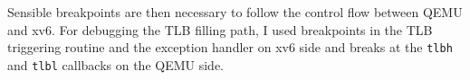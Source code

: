 Sensible breakpoints are then necessary to follow the control flow between QEMU and xv6. For debugging the TLB filling path, I used breakpoints in the TLB triggering routine and the exception handler on xv6 side and breaks at the \texttt{tlbh} and \texttt{tlbl} callbacks on the QEMU side.






